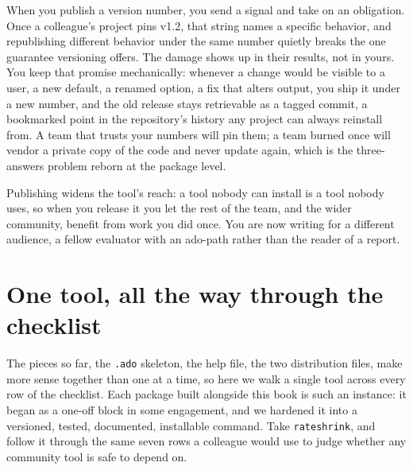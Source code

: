 \documentclass[
    a4paper,
    fontsize=10pt,
    twoside=true,
    numbers=noenddot,
]{kaobook}
\begin{document}
When you publish a version number, you send a signal and take on an obligation. Once a colleague's project pins v1.2, that string names a specific behavior, and republishing different behavior under the same number quietly breaks the one guarantee versioning offers. The damage shows up in their results, not in yours. You keep that promise mechanically: whenever a change would be visible to a user, a new default, a renamed option, a fix that alters output, you ship it under a new number, and the old release stays retrievable as a tagged commit, a bookmarked point in the repository's history any project can always reinstall from. A team that trusts your numbers will pin them; a team burned once will vendor a private copy of the code and never update again, which is the three-answers problem reborn at the package level.

Publishing widens the tool's reach: a tool nobody can install is a tool nobody uses, so when you release it you let the rest of the team, and the wider community, benefit from work you did once. You are now writing for a different audience, a fellow evaluator with an ado-path rather than the reader of a report.

\section{One tool, all the way through the checklist}\label{sec:rateshrink-walk}
The pieces so far, the \texttt{.ado} skeleton, the help file, the two distribution files, make more sense together than one at a time, so here we walk a single tool across every row of the checklist. Each package built alongside this book is such an instance: it began as a one-off block in some engagement, and we hardened it into a versioned, tested, documented, installable command. Take \texttt{rateshrink}, and follow it through the same seven rows a colleague would use to judge whether any community tool is safe to depend on.
\end{document}
